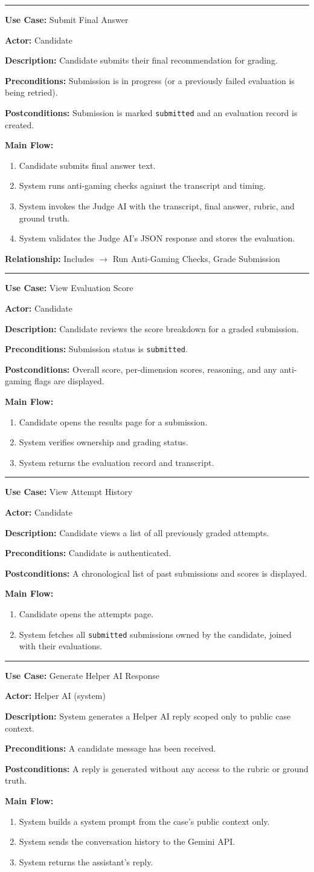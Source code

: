 \documentclass[11pt]{article}
\newcommand{\ucbox}[6]{%
  \noindent\rule{\linewidth}{0.5pt}\par
  \textbf{Use Case:} #1\par
  \textbf{Actor:} #2\par
  \textbf{Description:} #3\par
  \textbf{Preconditions:} #4\par
  \textbf{Postconditions:} #5\par
  \textbf{Main Flow:}\par
  #6
}
\begin{document}
\vspace{0.3cm}
\ucbox{Submit Final Answer}{Candidate}
{Candidate submits their final recommendation for grading.}
{Submission is in progress (or a previously failed evaluation is being retried).}
{Submission is marked \texttt{submitted} and an evaluation record is created.}
{
\begin{enumerate}[nosep]
  \item Candidate submits final answer text.
  \item System runs anti-gaming checks against the transcript and timing.
  \item System invokes the Judge AI with the transcript, final answer, rubric, and ground truth.
  \item System validates the Judge AI's JSON response and stores the evaluation.
\end{enumerate}
}
\textbf{Relationship:} Includes $\rightarrow$ Run Anti-Gaming Checks, Grade Submission

\vspace{0.3cm}
\ucbox{View Evaluation Score}{Candidate}
{Candidate reviews the score breakdown for a graded submission.}
{Submission status is \texttt{submitted}.}
{Overall score, per-dimension scores, reasoning, and any anti-gaming flags are displayed.}
{
\begin{enumerate}[nosep]
  \item Candidate opens the results page for a submission.
  \item System verifies ownership and grading status.
  \item System returns the evaluation record and transcript.
\end{enumerate}
}

\vspace{0.3cm}
\ucbox{View Attempt History}{Candidate}
{Candidate views a list of all previously graded attempts.}
{Candidate is authenticated.}
{A chronological list of past submissions and scores is displayed.}
{
\begin{enumerate}[nosep]
  \item Candidate opens the attempts page.
  \item System fetches all \texttt{submitted} submissions owned by the candidate, joined with their evaluations.
\end{enumerate}
}

\vspace{0.3cm}
\ucbox{Generate Helper AI Response}{Helper AI (system)}
{System generates a Helper AI reply scoped only to public case context.}
{A candidate message has been received.}
{A reply is generated without any access to the rubric or ground truth.}
{
\begin{enumerate}[nosep]
  \item System builds a system prompt from the case's public context only.
  \item System sends the conversation history to the Gemini API.
  \item System returns the assistant's reply.
\end{enumerate}
}
\end{document}
